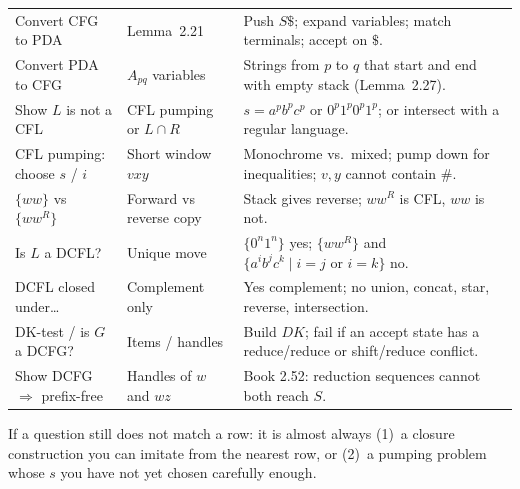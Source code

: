 \documentclass[11pt,a4paper]{article}
\begin{document}
{\begin{longtable}{@{}>{\raggedright\arraybackslash}p{}
                    >{\raggedright\arraybackslash}p{}
                    >{\raggedright\arraybackslash}p{}@{}}
Convert CFG to PDA
  & Lemma~2.21
  & Push $S\$$; expand variables; match terminals; accept
    on $\$$. \\
Convert PDA to CFG
  & $A_{pq}$ variables
  & Strings from $p$ to $q$ that start and end with empty
    stack (Lemma~2.27). \\
Show $L$ is not a CFL
  & CFL pumping or $L\cap R$
  & $s=a^pb^pc^p$ or $0^p1^p0^p1^p$; or intersect with a
    regular language. \\
CFL pumping: choose $s$ / $i$
  & Short window $vxy$
  & Monochrome vs.\ mixed; pump down for inequalities;
    $v,y$ cannot contain $\#$. \\
$\{ww\}$ vs $\{ww^R\}$
  & Forward vs reverse copy
  & Stack gives reverse; $ww^R$ is CFL, $ww$ is not. \\
Is $L$ a DCFL?
  & Unique move
  & $\{0^n1^n\}$ yes; $\{ww^R\}$ and
    $\{a^ib^jc^k\mid i=j\text{ or }i=k\}$ no. \\
DCFL closed under\ldots
  & Complement only
  & Yes complement; no union, concat, star, reverse,
    intersection. \\
DK-test / is $G$ a DCFG?
  & Items / handles
  & Build $DK$; fail if an accept state has a
    reduce/reduce or shift/reduce conflict. \\
Show DCFG $\Rightarrow$ prefix-free
  & Handles of $w$ and $wz$
  & Book 2.52: reduction sequences cannot both reach $S$. \\
\end{longtable}
}

\vspace{0.6em}
\noindent
If a question still does not match a row: it is almost always
(1)~a closure construction you can imitate from the nearest
row, or (2)~a pumping problem whose $s$ you have not yet
chosen carefully enough.
\end{document}
